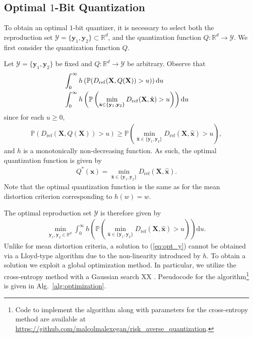 \documentclass[conference]{IEEEtran}
\begin{document}
\subsection{Optimal $1$-Bit Quantization}

To obtain an optimal $1$-bit quantizer, it is necessary to select both the reproduction set $\mathcal{Y} = \{\mathbf{y}_1,\mathbf{y}_2\} \subset \mathbb{R}^d$, and the quantization function $Q: \mathbb{R}^d \rightarrow \mathcal{Y}$. We first consider the quantization function $Q$. 

Let $\mathcal{Y} = \{\mathbf{y}_1,\mathbf{y}_2\}$ be fixed and $Q: \mathbb{R}^d \rightarrow \mathcal{Y}$ be arbitrary. Observe that 
\begin{align}
	&\int_0^{\infty} h\left(\mathbb{P}(D_{\mathrm{ref}}(\mathbf{X},Q(\mathbf{X})) > u)\right)\mathrm{d}u\notag\\
	&\int_0^{\infty} h\left(\mathbb{P}\left(\min_{\hat{\mathbf{x}} \in \{\mathbf{y}_1,\mathbf{y}_2\}} D_{\mathrm{ref}}(\mathbf{X},\hat{\mathbf{x}}) > u\right)\right)\mathrm{d}u
\end{align}
since for each $u \geq 0$, 
\begin{align}
	\mathbb{P}(D_{\mathrm{ref}}(\mathbf{X},Q(\mathbf{X})) > u) \geq \mathbb{P}\left(\min_{\hat{\mathbf{x}} \in \{\mathbf{y}_1,\mathbf{y}_2\}} D_{\mathrm{ref}}(\mathbf{X},\hat{\mathbf{x}}) > u\right),
\end{align}
and $h$ is a monotonically non-decreasing function. As such, the optimal quantization function is given by 
\begin{align}
	Q^*(\mathbf{x}) = \min_{\hat{\mathbf{x}} \in \{\mathbf{y}_1,\mathbf{y}_2\}} D_{\mathrm{ref}}(\mathbf{X},\hat{\mathbf{x}}).
\end{align} 
Note that the optimal quantization function is the same as for the mean distortion criterion corresponding to $h(w) = w$. 

The optimal reproduction set $\mathcal{Y}$ is therefore given by 
\begin{align}\label{eq:opt_y}
	\min_{\mathbf{y}_1,\mathbf{y}_2 \in \mathbb{R}^d} \int_0^{\infty} h\left(\mathbb{P}\left(\min_{\hat{\mathbf{x}} \in \{\mathbf{y}_1,\mathbf{y}_2\}} D_{\mathrm{ref}}(\mathbf{X},\hat{\mathbf{x}}) > u\right)\right)\mathrm{d}u. 
\end{align}
Unlike for mean distortion criteria, a solution to (\ref{eq:opt_y}) cannot be obtained via a Lloyd-type algorithm \cite{Linde1980algorithm} due to the non-linearity introduced by $h$. To obtain a solution we exploit a global optimization method. In particular, we utilize the cross-entropy method with a Gaussian search XX \cite{Botev2013cross}. Pseudocode for the algorithm\footnote{Code to implement the algorithm along with parameters for the cross-entropy method are available at \url{https://github.com/malcolmalexegan/risk_averse_quantization}.} is given in Alg.~\ref{alg:optimization}.
\end{document}
